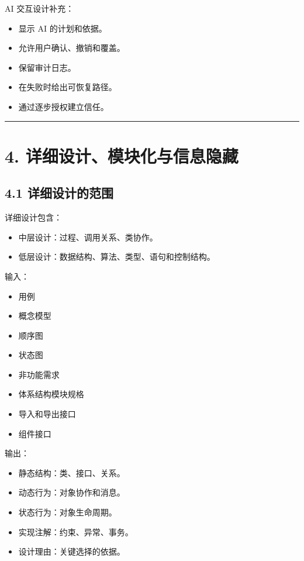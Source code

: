 \documentclass[UTF8,zihao=-4]{ctexart}
\begin{document}
AI 交互设计补充：

\begin{itemize}
\item 显示 AI 的计划和依据。
\item 允许用户确认、撤销和覆盖。
\item 保留审计日志。
\item 在失败时给出可恢复路径。
\item 通过逐步授权建立信任。
\end{itemize}

\bigskip\hrule\bigskip

\section{4. 详细设计、模块化与信息隐藏}

\subsection{4.1 详细设计的范围}

详细设计包含：

\begin{itemize}
\item 中层设计：过程、调用关系、类协作。
\item 低层设计：数据结构、算法、类型、语句和控制结构。
\end{itemize}

输入：

\begin{itemize}
\item 用例
\item 概念模型
\item 顺序图
\item 状态图
\item 非功能需求
\item 体系结构模块规格
\item 导入和导出接口
\item 组件接口
\end{itemize}

输出：

\begin{itemize}
\item 静态结构：类、接口、关系。
\item 动态行为：对象协作和消息。
\item 状态行为：对象生命周期。
\item 实现注解：约束、异常、事务。
\item 设计理由：关键选择的依据。
\end{itemize}
\end{document}
